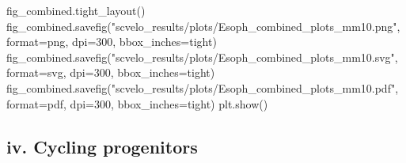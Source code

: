 \documentclass[
  letterpaper,
  DIV=11,
  numbers=noendperiod]{scrreprt}
\newenvironment{Shaded}{\begin{snugshade}}{\end{snugshade}}
\newcommand{\BuiltInTok}[1]{\textcolor[rgb]{0.00,0.23,0.31}{#1}}
\newcommand{\DecValTok}[1]{\textcolor[rgb]{0.68,0.00,0.00}{#1}}
\newcommand{\NormalTok}[1]{\textcolor[rgb]{0.00,0.23,0.31}{#1}}
\newcommand{\OperatorTok}[1]{\textcolor[rgb]{0.37,0.37,0.37}{#1}}
\newcommand{\StringTok}[1]{\textcolor[rgb]{0.13,0.47,0.30}{#1}}
\begin{document}
\begin{Shaded}
\begin{Highlighting}[]
\NormalTok{fig\_combined.tight\_layout()}
\NormalTok{fig\_combined.savefig(}\StringTok{"scvelo\_results/plots/Esoph\_combined\_plots\_mm10.png"}\NormalTok{, }\BuiltInTok{format}\OperatorTok{=}\StringTok{\textquotesingle{}png\textquotesingle{}}\NormalTok{, dpi}\OperatorTok{=}\DecValTok{300}\NormalTok{, bbox\_inches}\OperatorTok{=}\StringTok{\textquotesingle{}tight\textquotesingle{}}\NormalTok{)}
\NormalTok{fig\_combined.savefig(}\StringTok{"scvelo\_results/plots/Esoph\_combined\_plots\_mm10.svg"}\NormalTok{, }\BuiltInTok{format}\OperatorTok{=}\StringTok{\textquotesingle{}svg\textquotesingle{}}\NormalTok{, dpi}\OperatorTok{=}\DecValTok{300}\NormalTok{, bbox\_inches}\OperatorTok{=}\StringTok{\textquotesingle{}tight\textquotesingle{}}\NormalTok{)}
\NormalTok{fig\_combined.savefig(}\StringTok{"scvelo\_results/plots/Esoph\_combined\_plots\_mm10.pdf"}\NormalTok{, }\BuiltInTok{format}\OperatorTok{=}\StringTok{\textquotesingle{}pdf\textquotesingle{}}\NormalTok{, dpi}\OperatorTok{=}\DecValTok{300}\NormalTok{, bbox\_inches}\OperatorTok{=}\StringTok{\textquotesingle{}tight\textquotesingle{}}\NormalTok{)}
\NormalTok{plt.show()}
\end{Highlighting}
\end{Shaded}

\subsection{iv. Cycling progenitors}\label{iv.-cycling-progenitors}
\end{document}
